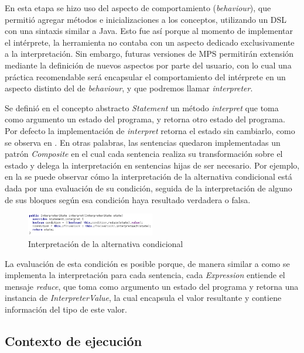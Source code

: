 En esta etapa se hizo uso del aspecto de comportamiento (\textit{behaviour}), que permitió agregar métodos e inicializaciones a los conceptos, utilizando un DSL con una sintaxis similar a Java. Esto fue así porque al momento de implementar el intérprete, la herramienta no contaba con un aspecto dedicado exclusivamente a la interpretación. Sin embargo, futuras versiones de MPS permitirán extensión mediante la definición de nuevos aspectos por parte del usuario, con lo cual una práctica recomendable será encapsular el comportamiento del intérprete en un aspecto distinto del de \textit{behaviour}, y que podremos llamar \textit{interpreter}.

Se definió en el concepto abstracto \textit{Statement} un método \textit{interpret} que toma como argumento un estado del programa, y retorna otro estado del programa. Por defecto la implementación de \textit{interpret} retorna el estado sin cambiarlo, como se observa en . En otras palabras, las sentencias quedaron implementadas un patrón \textit{Composite} \cite{Gamma} en el cual cada sentencia realiza su transformación sobre el estado y delega la interpretación en sentencias hijas de ser necesario. Por ejemplo, en la  se puede observar cómo la interpretación de la alternativa condicional está dada por una evaluación de su condición, seguida de la interpretación de alguno de sus bloques según esa condición haya resultado verdadera o falsa.




\begin{figure}[hb]
\centering
\includegraphics[width=0.5\textwidth]{assets/behavior_ifElse}
\caption{Interpretación de la alternativa condicional}
\label{fig:behavior_ifElse}
\end{figure}

La evaluación de esta condición es posible porque, de manera similar a como se implementa la interpretación para cada sentencia, cada \textit{Expression} entiende el mensaje \textit{reduce}, que toma como argumento un estado del programa y retorna una instancia de \textit{InterpreterValue}, la cual encapsula el valor resultante y contiene información del tipo de este valor. 

\subsection{Contexto de ejecución}

